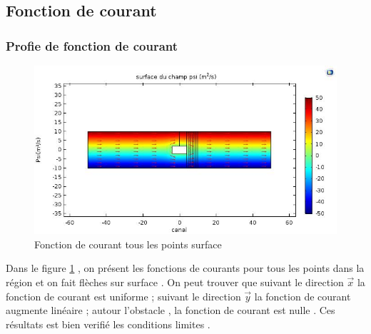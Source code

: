 \documentclass[a4paper,11pt]{report} %
\begin{document}
\subsection{Fonction de courant}
\subsubsection{Profie de fonction de courant}
\begin{figure}[!h]
\centering
\hspace*{0mm}\vfill
\begin{center} \includegraphics[width=1.\textwidth]{psi_surface.jpg} \end{center}
\vfill\hspace*{0mm}
\caption{Fonction de courant tous les points surface }
\label{phi_surface}
\end{figure}\pagebreak
Dans le figure \ref{phi_surface} , on présent les fonctions de courants pour tous les points dans la région et on fait flèches sur surface . On peut trouver que suivant le direction $\overrightarrow{x}$ la fonction de courant est uniforme ; suivant le direction $\overrightarrow{y}$ la fonction de courant augmente linéaire ; autour l'obstacle ,  la fonction de courant est nulle . Ces résultats est bien verifié les conditions limites . 
\end{document}
